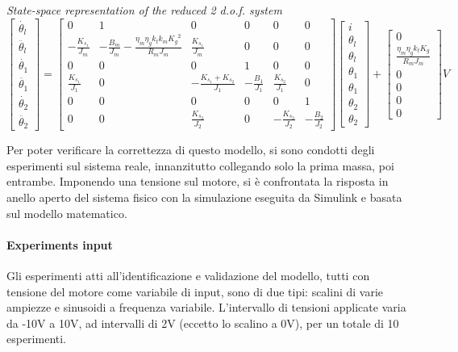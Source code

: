 \textit{State-space representation of the reduced 2 d.o.f. system}
\begin{equation}
	\begin{bmatrix}
		\dot{\theta_l} \\
		\ddot{\theta_l} \\
		\dot{\theta_1} \\
		\ddot{\theta_1} \\
		\dot{\theta_2} \\
		\ddot{\theta_2}
	\end{bmatrix}
	=
	\begin{bmatrix}
		0 &1 & 0 & 0 & 0 & 0 \\
		-\frac{K_{s_1}}{J_m} & -\frac{B_m}{J_m}-\frac{\eta_m \eta_g k_t k_m {K_g}^2}{R_m J_m}  & \frac{K_{s_1}}{J_m} & 0 & 0 & 0 \\
		0 & 0 & 0 & 1 & 0 & 0 \\
		\frac{K_{s_1}}{J_1} & 0 & -\frac{K_{s_1}+K_{s_2}}{J_1} & -\frac{B_1}{J_1} & \frac{K_{s_2}}{J_1} & 0 \\
		0 & 0 & 0 & 0 & 0 & 1 \\
		0 & 0 & \frac{K_{s_2}}{J_2} & 0 & -\frac{K_{s_2}}{J_2} & -\frac{B_2}{J_2}
	\end{bmatrix}
	\begin{bmatrix}
		i \\
		\theta_l \\
		\theta_l \\
		\theta_1 \\
		\theta_1 \\
		\theta_2 \\
		\theta_2
	\end{bmatrix}
	+
	\begin{bmatrix}
		0 \\
		\frac{\eta_m \eta_g k_t K_g}{R_m J_m} \\
		0 \\
		0 \\
		0 \\
		0
	\end{bmatrix}
	V
\end{equation}

Per poter verificare la correttezza di questo modello, si sono condotti degli esperimenti sul sistema reale, innanzitutto collegando solo la prima massa, poi entrambe.
Imponendo una tensione sul motore, si è confrontata la risposta in anello aperto del sistema fisico con la simulazione eseguita da Simulink e basata sul modello matematico.
\paragraph{Experiments input}
Gli esperimenti atti all'identificazione e validazione del modello, tutti con tensione del motore come variabile di input, sono di due tipi: scalini di varie ampiezze e sinusoidi a frequenza variabile. 
L'intervallo di tensioni applicate varia da -10V a 10V, ad intervalli di 2V (eccetto lo scalino a 0V), per un totale di 10 esperimenti.

